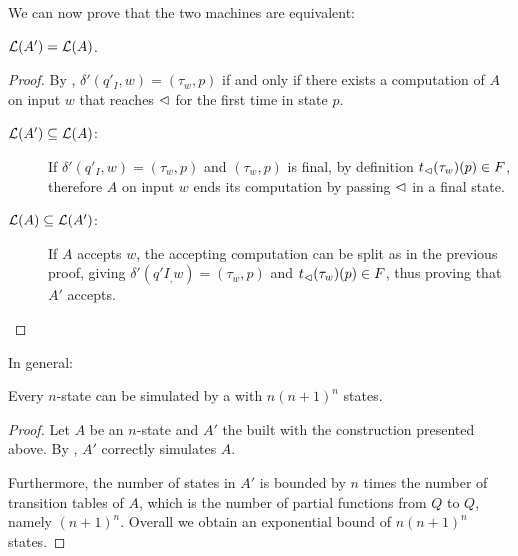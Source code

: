 We can now prove that the two machines are equivalent:
\begin{thrm}\label{thm:transtab2DFA}
	$\mathcal L(A')=\mathcal L(A)$.
\end{thrm}
\begin{proof}
	By , $\delta'(q'_I,w)=(\tau_w,p)$ if and only if there exists a computation of $A$ on input $w$ that reaches $\lhd$ for the first time in state $p$.
	\begin{description}
		\item[$\mathcal L(A')\subseteq\mathcal L(A)$:] If $\delta'(q'_I,w)=(\tau_w,p)$ and $(\tau_w,p)$ is final, by definition $t_\lhd(\tau_w)(p)\in F$, therefore $A$ on input $w$ ends its computation by passing $\lhd$ in a final state.
		\item[$\mathcal L(A)\subseteq\mathcal L(A')$:] If $A$ accepts $w$, the accepting computation can be split as in the previous proof, giving $\delta'(q'I_,w)=(\tau_w,p)$ and $t_\lhd(\tau_w)(p)\in F$, thus proving that $A'$ accepts. \qedhere
	\end{description}
\end{proof}

In general:
\begin{thrm}
	Every $n$-state \TDFA can be simulated by a \ODFA with $n(n+1)^n$ states.
\end{thrm}
\begin{proof}
	Let $A$ be an $n$-state \TDFA and $A'$ the \ODFA built with the construction presented above.
	By , $A'$ correctly simulates $A$.

	Furthermore, the number of states in $A'$ is bounded by $n$ times the number of transition tables of $A$, which is the number of partial functions from $Q$ to $Q$, namely $(n+1)^n$.
	Overall we obtain an exponential bound of $n(n+1)^n$ states.
\end{proof}
